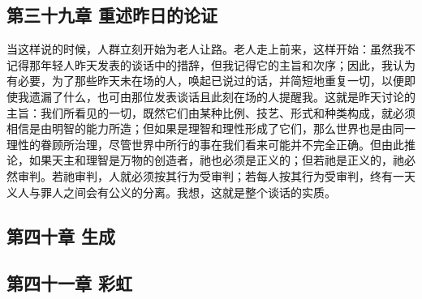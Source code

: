 
\subsection{第三十九章  重述昨日的论证}

当这样说的时候，人群立刻开始为老人让路。老人走上前来，这样开始：虽然我不记得那年轻人昨天发表的谈话中的措辞，但我记得它的主旨和次序；因此，我认为有必要，为了那些昨天未在场的人，唤起已说过的话，并简短地重复一切，以便即使我遗漏了什么，也可由那位发表谈话且此刻在场的人提醒我。这就是昨天讨论的主旨：我们所看见的一切，既然它们由某种比例、技艺、形式和种类构成，就必须相信是由明智的能力所造；但如果是理智和理性形成了它们，那么世界也是由同一理性的眷顾所治理，尽管世界中所行的事在我们看来可能并不完全正确。但由此推论，如果天主和理智是万物的创造者，祂也必须是正义的；但若祂是正义的，祂必然审判。若祂审判，人就必须按其行为受审判；若每人按其行为受审判，终有一天义人与罪人之间会有公义的分离。我想，这就是整个谈话的实质。\par


\subsection{第四十章 生成}

\par


\subsection{第四十一章 彩虹}

